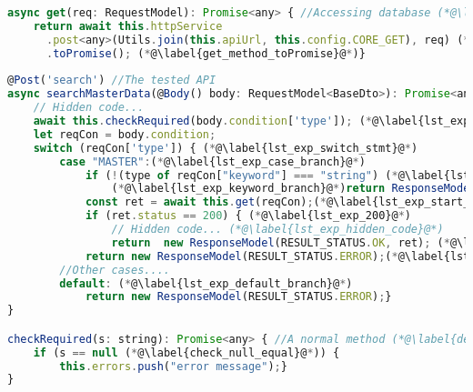 \begin{lstlisting}[float,language=JavaScript,caption={Ví dụ phương thức API ($searchMasterData()$) gọi đến hai phương thức khác, trong đó có một phương thức ($get()$) cần được tạo hàm giả khi thực thi kiểm thử}, label=api_example,captionpos=b]
async get(req: RequestModel): Promise<any> { //Accessing database (*@\label{declare_get_method}@*)
    return await this.httpService
      .post<any>(Utils.join(this.apiUrl, this.config.CORE_GET), req) (*@\label{call_http_service}@*)
      .toPromise(); (*@\label{get_method_toPromise}@*)}
      
@Post('search') //The tested API
async searchMasterData(@Body() body: RequestModel<BaseDto>): Promise<any> { (*@\label{declare_api_method}@*)
    // Hidden code...
    await this.checkRequired(body.condition['type']); (*@\label{lst_exp_check_require}@*)
    let reqCon = body.condition;
    switch (reqCon['type']) { (*@\label{lst_exp_switch_stmt}@*)
        case "MASTER":(*@\label{lst_exp_case_branch}@*)
            if (!(type of reqCon["keyword"] === "string") (*@\label{lst_exp_if_stmt}@*)) {
                (*@\label{lst_exp_keyword_branch}@*)return ResponseModel(RESULT_STATUS.ERROR);}
            const ret = await this.get(reqCon);(*@\label{lst_exp_start_uncover}@*)
            if (ret.status == 200) { (*@\label{lst_exp_200}@*) 
                // Hidden code... (*@\label{lst_exp_hidden_code}@*)
                return  new ResponseModel(RESULT_STATUS.OK, ret); (*@\label{lst_exp_end_uncover}@*)}
            return new ResponseModel(RESULT_STATUS.ERROR);(*@\label{lst_exp_return_error}@*)
        //Other cases....
        default: (*@\label{lst_exp_default_branch}@*)
            return new ResponseModel(RESULT_STATUS.ERROR);}
}

checkRequired(s: string): Promise<any> { //A normal method (*@\label{declare_check_required_method}@*)
    if (s == null (*@\label{check_null_equal}@*)) {
        this.errors.push("error message");}
}
\end{lstlisting}

